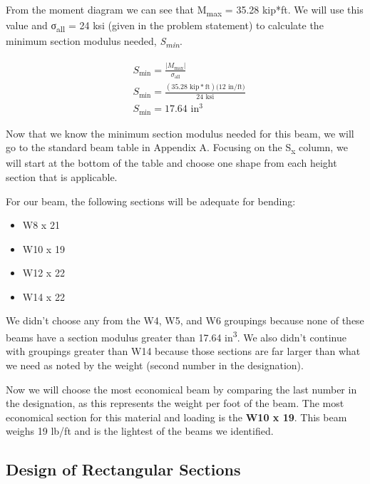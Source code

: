 \documentclass[
  letterpaper,
  DIV=11,
  numbers=noendperiod]{scrreprt}
\begin{document}
\begin{tcolorbox}
From the moment diagram we can see that
\textbar M\textsubscript{max}\textbar{} = 35.28 kip*ft. We will use this
value and σ\textsubscript{all} = 24 ksi (given in the problem statement)
to calculate the minimum section modulus needed,
\emph{S\textsubscript{min}}.

\[
\begin{aligned}
& S_\text{min}=\frac{|M_\text{max}|}{\sigma_\text{all}} \\
& S_\text{min}=\frac{(35.28\text{ kip} * \text{ft})(12\text{ in/ft)}}{24\text{ ksi}} \\
& S_\text{min}=17.64 \text{ in}^3
\end{aligned}
\]

Now that we know the minimum section modulus needed for this beam, we
will go to the standard beam table in Appendix A. Focusing on the
S\textsubscript{x} column, we will start at the bottom of the table and
choose one shape from each height section that is applicable.

For our beam, the following sections will be adequate for bending:

\begin{itemize}
\item
  W8 x 21
\item
  W10 x 19
\item
  W12 x 22
\item
  W14 x 22
\end{itemize}

We didn't choose any from the W4, W5, and W6 groupings because none of
these beams have a section modulus greater than 17.64
in\textsuperscript{3}. We also didn't continue with groupings greater
than W14 because those sections are far larger than what we need as
noted by the weight (second number in the designation).

Now we will choose the most economical beam by comparing the last number
in the designation, as this represents the weight per foot of the beam.
The most economical section for this material and loading is the
\textbf{W10 x 19}. This beam weighs 19 lb/ft and is the lightest of the
beams we identified.

\end{tcolorbox}

\subsection{Design of Rectangular
Sections}\label{design-of-rectangular-sections}
\end{document}
